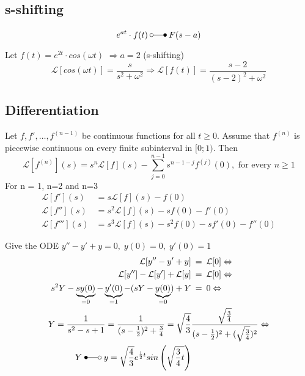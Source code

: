 \subsection{s-shifting}
\begin{equation*}
    e^{at}\cdot f(t)\:\laplace\:F(s-a)
\end{equation*}
\begin{examplesection}[Example]
    Let $f(t)=e^{2t}\cdot cos(\omega t)$ $\Rightarrow a=2$ (s-shifting)
	\begin{equation*}
        \mathcal{L}[cos(\omega t)]=\frac{s}{s^2+\omega ^2}\Rightarrow \mathcal{L}[f(t)]=\frac{s-2}{(s-2)^2+\omega ^2}
    \end{equation*}
\end{examplesection}

\subsection{Differentiation}
Let $f, f', \dots, f^{(n-1)}$ be continuous functions for all $t \geq 0$. Assume that $f^{(n)}$ is piecewise continuous on every finite subinterval in $[0;1)$. Then
\begin{equation*}
    \mathcal{L}[f^{(n)}](s)=s^n\mathcal{L}[f](s)-\sum_{j=0}^{n-1}s^{n-1-j}f^{(j)}(0),\text{ for every }n\geq1
\end{equation*}
For n = 1, n=2 and n=3
\begin{align*}
    \mathcal{L}[f'](s)&=s\mathcal{L}[f](s)-f(0) \\
    \mathcal{L}[f''](s)&=s^2\mathcal{L}[f](s)-sf(0)-f'(0) \\
    \mathcal{L}[f'''](s)&=s^3\mathcal{L}[f](s)-s^2f(0)-sf'(0)-f''(0)
\end{align*}
\begin{examplesection}[Example]
    Give the ODE $y''-y'+y=0,\;y(0)=0,\;y'(0)=1$
    \begin{align*}
        \mathcal{L}[y''-y'+y]&\:=\:\mathcal{L}[0] \Leftrightarrow \\
        \mathcal{L}[y'']-\mathcal{L}[y']+\mathcal{L}[y]&\:=\:\mathcal{L}[0] \Leftrightarrow \\
        s^2Y -\underbrace{sy(0)}_{=0}-\underbrace{y'(0)}_{=1}-(sY-\underbrace{y(0)}_{=0})+Y&\:=\:0 \Leftrightarrow \\
        Y=\frac{1}{s^2-s+1}=\frac{1}{(s-\frac{1}{2})^2+\frac{3}{4}}=\sqrt{\frac{4}{3}}&\frac{\sqrt{\frac{3}{4}}}{(s-\frac{1}{2})^2+(\sqrt{\frac{3}{4}})^2} \Leftrightarrow \\
        Y\;\Laplace\;y=\sqrt{\frac{4}{3}}e^{\frac{1}{2}t}sin\left(\sqrt{\frac{3}{4}t}\right)
    \end{align*}
\end{examplesection}

